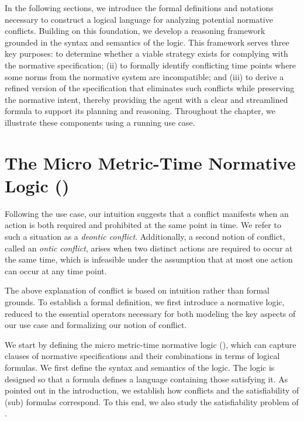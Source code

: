 In the following sections, we introduce the formal definitions and notations necessary to construct a logical language for analyzing potential normative conflicts. Building on this foundation, we develop a reasoning framework grounded in the syntax and semantics of the logic. This framework serves three key purposes:  to determine whether a viable strategy exists for complying with the normative specification; (ii) to formally identify conflicting time points where some norms from the normative system are incompatible; and (iii) to derive a refined version of the specification that eliminates such conflicts while preserving the normative intent, thereby providing the agent with a clear and streamlined formula to support its planning and reasoning. Throughout the chapter, we illustrate these components using a running use case.

\section{The Micro Metric-Time  Normative Logic (\TDDLfm)}\label{syntaxandsemantics}

Following the use case, our intuition suggests that a conflict manifests when an action is both required and prohibited at the same point in time. We refer to such a situation as a \emph{deontic conflict}.
%
Additionally, a second notion of conflict, called an \emph{ontic conflict}, arises when two distinct actions are required to occur at the same time, which is infeasible under the assumption that at most one action can occur at any time point.

The above explanation of conflict is based on intuition rather than formal grounds. To establish a formal definition, we first introduce a normative logic, reduced to the essential operators necessary for both modeling the key aspects of our use case and formalizing our notion of conflict.

We start by defining the micro metric-time normative logic (\TDDLfm), which can capture clauses of normative specifications and their combinations in terms of logical formulas. We first define the syntax and semantics of the logic. The logic is designed so that a formula defines a language containing those \timedwords satisfying it. As pointed out in the introduction, we establish how conflicts and the satisfiability of (sub) formulas correspond. To this end, we also study the satisfiability problem of \TDDLfm.


